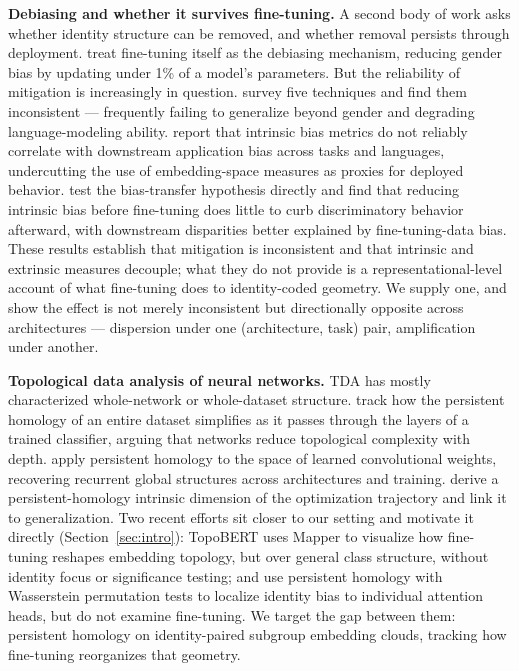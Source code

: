 \documentclass[11pt]{article}
\begin{document}
\textbf{Debiasing and whether it survives fine-tuning.} A second body of work asks whether identity structure can be removed, and whether removal persists through deployment. \citet{gira-etal-2022-debiasing} treat fine-tuning itself as the debiasing mechanism, reducing gender bias by updating under 1\% of a model's parameters. But the reliability of mitigation is increasingly in question. \citet{meade-etal-2022-empirical} survey five techniques and find them inconsistent --- frequently failing to generalize beyond gender and degrading language-modeling ability. \citet{goldfarb-tarrant-etal-2021-intrinsic} report that intrinsic bias metrics do not reliably correlate with downstream application bias across tasks and languages, undercutting the use of embedding-space measures as proxies for deployed behavior. \citet{steed-etal-2022-upstream} test the bias-transfer hypothesis directly and find that reducing intrinsic bias before fine-tuning does little to curb discriminatory behavior afterward, with downstream disparities better explained by fine-tuning-data bias. These results establish that mitigation is inconsistent and that intrinsic and extrinsic measures decouple; what they do not provide is a representational-level account of what fine-tuning does to identity-coded geometry. We supply one, and show the effect is not merely inconsistent but directionally opposite across architectures --- dispersion under one (architecture, task) pair, amplification under another.

\textbf{Topological data analysis of neural networks.} TDA has mostly characterized whole-network or whole-dataset structure. \citet{naitzat2020topology} track how the persistent homology of an entire dataset simplifies as it passes through the layers of a trained classifier, arguing that networks reduce topological complexity with depth. \citet{gabrielsson2019exposition} apply persistent homology to the space of learned convolutional weights, recovering recurrent global structures across architectures and training. \citet{birdal2021intrinsic} derive a persistent-homology intrinsic dimension of the optimization trajectory and link it to generalization. Two recent efforts sit closer to our setting and motivate it directly (Section~\ref{sec:intro}): TopoBERT \citep{rathore2023topobert} uses Mapper to visualize how fine-tuning reshapes embedding topology, but over general class structure, without identity focus or significance testing; and \citet{varadarajan2025augmenting} use persistent homology with Wasserstein permutation tests to localize identity bias to individual attention heads, but do not examine fine-tuning. We target the gap between them: persistent homology on identity-paired subgroup embedding clouds, tracking how fine-tuning reorganizes that geometry.
\end{document}
